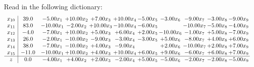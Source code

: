 \documentclass[9pt]{article}
\begin{document}
Read in the following dictionary:
\[\begin{array}{c| c c@{\hskip 2pt} c@{\hskip 2pt} c@{\hskip 2pt} c@{\hskip 2pt} c@{\hskip 2pt} c@{\hskip 2pt} c@{\hskip 2pt} c@{\hskip 2pt} c@{\hskip 2pt} }
 x_{10}   &  39.0 & -5.00 x_{1} & + 10.00 x_{2} & +  7.00 x_{3} & + 10.00 x_{4} & -5.00 x_{5} & -3.00 x_{6} & -9.00 x_{7} & -3.00 x_{8} & -9.00 x_{9}\\
 x_{11}   &  83.0 & -10.00 x_{1} & -2.00 x_{2} & + 10.00 x_{3} & -10.00 x_{4} & -6.00 x_{5} &   & -10.00 x_{7} & -5.00 x_{8} & -4.00 x_{9}\\
 x_{12}   &  -4.0 & -7.00 x_{1} & + 10.00 x_{2} & +  5.00 x_{3} & +  6.00 x_{4} & +  2.00 x_{5} & -10.00 x_{6} & -1.00 x_{7} & +  5.00 x_{8} & -7.00 x_{9}\\
 x_{13}   &  26.0 & -2.00 x_{1} & -10.00 x_{2} & -9.00 x_{3} & -3.00 x_{4} & -3.00 x_{5} & +  5.00 x_{6} & -8.00 x_{7} & +  4.00 x_{8} & +  6.00 x_{9}\\
 x_{14}   &  38.0 & -7.00 x_{1} & -10.00 x_{2} & +  4.00 x_{3} & -9.00 x_{4} &   & +  2.00 x_{6} & -10.00 x_{7} & +  2.00 x_{8} & +  7.00 x_{9}\\
 x_{15}   &  -11.0 & -10.00 x_{1} & + 10.00 x_{2} & +  4.00 x_{3} & + 10.00 x_{4} & +  6.00 x_{5} & +  9.00 x_{6} & -6.00 x_{7} & +  6.00 x_{8} & +  7.00 x_{9}\\
\hline
z    &  0.0 & -4.00 x_{1} & +  4.00 x_{2} & +  2.00 x_{3} & -2.00 x_{4} & +  5.00 x_{5} & -5.00 x_{6} & -2.00 x_{7} & -2.00 x_{8} & -5.00 x_{9}\\
\end{array}\]
\end{document}
